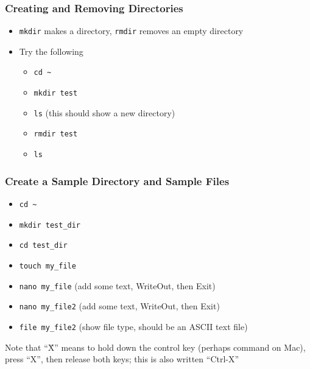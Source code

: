 \documentclass[hyperref,pdfa,unicode,utf8,usepdftitle]{beamer}
\begin{document}
\begin{frame}
  \frametitle{Creating and Removing Directories}
  \begin{itemize}
  \item \lstinline{mkdir} makes a directory, \lstinline{rmdir} removes
    an empty directory
  \item Try the following
    \begin{itemize}
    \item \lstinline{cd ~}
    \item \lstinline{mkdir test}
    \item \lstinline{ls} (this should show a new directory)
    \item \lstinline{rmdir test}
    \item \lstinline{ls}
    \end{itemize}
  \end{itemize}
\end{frame}

\begin{frame}
  \frametitle{Create a Sample Directory and Sample Files}
  \begin{itemize}
  \item \lstinline{cd ~}
  \item \lstinline{mkdir test_dir}
  \item \lstinline{cd test_dir}
  \item \lstinline{touch my_file}
  \item \lstinline{nano my_file} (add some text, WriteOut, then Exit)
  \item \lstinline{nano my_file2} (add some text, WriteOut, then Exit)
  \item \lstinline{file my_file2} (show file type, should be an ASCII
    text file)
  \end{itemize}

  Note that “\^X” means to hold down the control key (perhaps command
  on Mac), press “X”, then release both keys; this is also written
  “Ctrl-X”
\end{frame}
\end{document}
